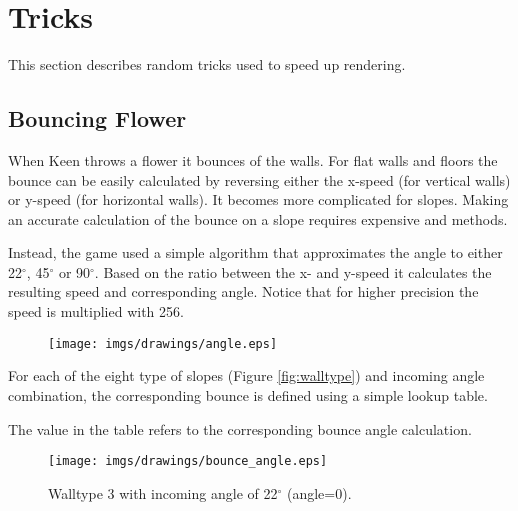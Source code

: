 \documentclass[book.tex]{subfiles}
\begin{document}
\section{Tricks}

This section describes random tricks used to speed up rendering. 




\subsection{Bouncing Flower}
When Keen throws a flower it bounces of the walls. For flat walls and floors the bounce can be easily calculated by reversing either the x-speed (for vertical walls) or y-speed (for horizontal walls). It becomes more complicated for slopes. Making an accurate calculation of the bounce on a slope requires expensive  and  methods. \\
\par
Instead, the game used a simple algorithm that approximates the angle to either 22$^{\circ}$, 45$^{\circ}$ or 90$^{\circ}$. Based on the ratio between the x- and y-speed it calculates the resulting speed and corresponding angle. Notice that for higher precision the speed is multiplied with 256.\\
\par
\begin{figure}[H]
\centering
\texttt{[image: imgs/drawings/angle.eps]}
\label{fig:angles}
\end{figure}
\par

For each of the eight type of slopes (Figure \ref{fig:walltype}) and incoming angle combination, the corresponding bounce is defined using a simple lookup table.\\

\par
\begin{minipage}{\textwidth}
  
\end{minipage}
\label{wallclip_array}
\par

The value in the table refers to the corresponding bounce angle calculation.

\par
\begin{figure}[H]
\centering
\texttt{[image: imgs/drawings/bounce\_angle.eps]}
\caption{Walltype 3 with incoming angle of 22$^{\circ}$ (angle=0).}
\label{fig:bounce_angles}
\end{figure}
\par
\end{document}
